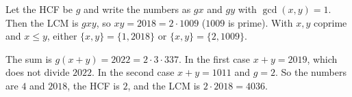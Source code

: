 Let the HCF be $g$ and write the numbers as $gx$ and $gy$ with $\gcd(x,y)=1$. Then the LCM is $gxy$, so $xy=2018=2\cdot1009$ ($1009$ is prime). With $x,y$ coprime and $x\le y$, either $\{x,y\}=\{1,2018\}$ or $\{x,y\}=\{2,1009\}$.

The sum is $g(x+y)=2022=2\cdot3\cdot337$. In the first case $x+y=2019$, which does not divide $2022$. In the second case $x+y=1011$ and $g=2$. So the numbers are $4$ and $2018$, the HCF is $2$, and the LCM is $2\cdot2018=\boxed{4036}$.
